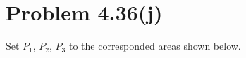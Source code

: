 \documentclass{article}
\def\math#1{$#1$}
\begin{document}
\section{Problem 4.36(j)}

\def\firstcircle{(0,0) circle (1) (0,1)}
\def\secondcircle{(1,0) circle (1) (1,1)}
\def\totalrectangle{(-2,-2) rectangle (3,2)}
\def\rectangletextbox{(0,0) rectangle (0,0)}

Set \math{P_1}, \math{P_2}, \math{P_3} to the corresponded areas shown below. 

\begin{center}
\end{center}
\end{document}

